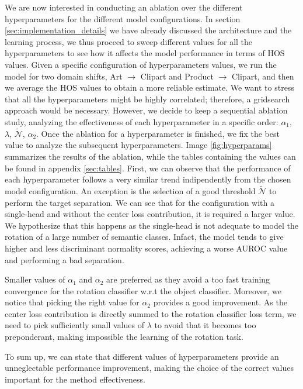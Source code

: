 \documentclass[10pt,twocolumn,letterpaper]{article}
\begin{document}
We are now interested in conducting an ablation over the different hyperparameters for the different model configurations.
In section \ref{sec:implementation_details} we have already discussed the architecture and the learning process,
we thus proceed to sweep different values for all the hyperparameters to see how it affects the model performance in terms of HOS values.
Given a specific configuration of hyperparameters values, we run the model for two domain shifts,
Art $\to$ Clipart and Product $\to$ Clipart, and then we average the HOS values to obtain a more reliable estimate.
We want to stress that all the hyperparameters might be highly correlated;
therefore, a gridsearch approach would be necessary.
However, we decide to keep a sequential ablation study,
analyzing the effectiveness of each hyperparameter in a specific order:
$\alpha_1$, $\lambda$, $\mathcal{\tilde N}$, $\alpha_2$.
Once the ablation for a hyperparameter is finished,
we fix the best value to analyze the subsequent hyperparameters.
Image \ref{fig:hyperparams} summarizes the results of the ablation,
while the tables containing the values can be found in appendix \ref{sec:tables}.
First, we can observe that the performance of each hyperparameter follows a very similar trend
indipendently from the chosen model configuration.
An exception is the selection of a good threshold $\mathcal{\tilde N}$ to perform the
target separation. We can see that for the configuration with a single-head and without
the center loss contribution, it is required a larger value.
We hypothesize that this happens as the single-head is not adequate
to model the rotation of a large number of semantic classes.
Infact, the model tends to give higher and less discriminant normality scores,
achieving a worse AUROC value and performing a bad separation.

Smaller values of $\alpha_1$ and $\alpha_2$ are preferred as they avoid a too fast training convergence for the rotation classifier
w.r.t the object classifier.
Moreover, we notice that picking the right value for $\alpha_2$ provides a good improvement.
As the center loss contribution is directly summed to the rotation classifier loss term,
we need to pick sufficiently small values of $\lambda$ to avoid
that it becomes too preponderant, making impossible the learning of the rotation task.

To sum up, we can state that different values of hyperparameters provide an unneglectable performance improvement,
making the choice of the correct values important for the method effectiveness.
\end{document}
